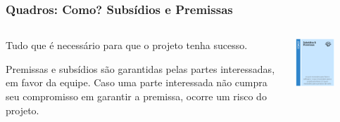 \documentclass[aspectratio=169]{beamer}
\begin{document}
\begin{frame}
\frametitle{Quadros: Como? Subsídios e Premissas}
\begin{columns}
    \begin{column}{.66\textwidth}
Tudo que é necessário para que o projeto tenha sucesso.

Premissas e subsídios são garantidas pelas partes interessadas, em favor da equipe. Caso uma parte interessada não cumpra seu compromisso em garantir a premissa, ocorre um risco do projeto.

    \end{column}
    \begin{column}{.33\textwidth}
            \centering
    \includegraphics[width=0.6\textwidth]{detalhes/como.png}
    \end{column}
\end{columns}

    
\end{frame}
\end{document}
